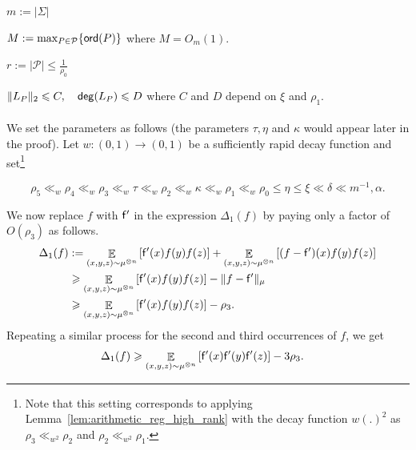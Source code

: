 \documentclass[10pt,a4paper]{amsart}
\newcommand\norm[1]{\| #1 \|}
\newcommand\Expect[2]{{\mathop{\mathbb{E}}_{#1}\left[ {#2} \right]}}
\renewcommand\geq{\geqslant}
\renewcommand\leq{\leqslant}
\newcommand{\V}[1]{{#1}}
\newcommand{\abnote}[1]{({\color{blue} AB: #1})}
\begin{document}
$m := |\Sigma|$


$M := \max_{P\in \mathcal{P}} \{{\sf ord}(P) \}$ where $M= O_m(1)$.

$r:= |\mathcal{P}|  \leq \frac{1}{\rho_0}$

$\|L_P\|_2\leq C, \quad {\sf deg}(L_P) \leq D$ where $C$ and $D$ depend on $\xi$ and $\rho_1$.\\
\\
%
We set the parameters as follows (the parameters $\tau, \eta$ and $\kappa$ would appear later in the proof).  Let $w\colon (0,1)\to(0,1)$ be a sufficiently rapid decay function and set\footnote{Note that this setting corresponds to applying Lemma~\ref{lem:arithmetic_reg_high_rank} with the decay function $w(.)^2$ as $\rho_3\ll_{w^2} \rho_2$ and $\rho_2\ll_{w^2}\rho_1$.}

\begin{equation}
    \label{eq:parameters}
    \rho_5\ll_w \rho_4\ll_w \rho_3\ll_w \tau\ll_w \rho_2\ll_w \kappa\ll_w \rho_1 \ll_w \rho_0 \leq \eta \leq \xi  \ll \delta \ll m^{-1},\alpha.
\end{equation}




We now replace $f$ with $\mathsf{f}'$ in the expression $\Delta_1(f)$ by paying only a factor of $O(\rho_3)$ as follows.
%
\begin{align}
    \Delta_1(f) &:=\Expect{(\V x, \V y, \V z)\sim \mu^{\otimes n}}{ \noisyfrefined(\V x) f(\V y) f(\V z)} + \Expect{(\V x, \V y, \V z)\sim \mu^{\otimes n}}{ (f- \noisyfrefined)(\V x) f(\V y) f(\V z)} \nonumber\\
    & \geq  \Expect{(\V x, \V y, \V z)\sim \mu^{\otimes n}}{\noisyfrefined(\V x) f(\V y) f(\V z)} - \norm{f-\noisyfrefined}_{\mu}\nonumber\\
        & \geq \Expect{(\V x, \V y, \V z)\sim \mu^{\otimes n}}{\noisyfrefined(\V x) f(\V y) f(\V z)}- \rho_3.\nonumber
 \end{align}
Repeating a similar process for the second and third occurrences of $f$, we get
\begin{align}
    \Delta_1(f) & \geq\Expect{(\V x, \V y, \V z)\sim \mu^{\otimes n}}{ \noisyfrefined(\V x) \noisyfrefined(\V y) \noisyfrefined(\V z)}- 3\rho_3. \label{eq:delta1_to_delta2}
\end{align}
\end{document}
